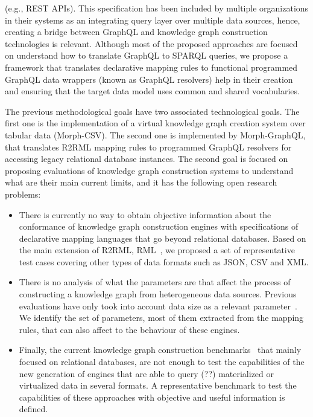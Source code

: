 \begin{itemize}
    (e.g., REST APIs). This specification has been included by multiple organizations in their systems as an integrating query layer over multiple data sources, hence, creating a bridge between GraphQL and knowledge graph construction technologies is relevant. Although most of the proposed approaches are focused on understand how to translate GraphQL to SPARQL queries, we propose a framework that translates declarative mapping rules to functional programmed GraphQL data wrappers (known as GraphQL resolvers) help in their creation and ensuring that the target data model uses common and shared vocabularies.
\end{itemize}

The previous methodological goals have two associated technological goals. The first one is the implementation of a virtual knowledge graph creation system over tabular data (Morph-CSV). The second one is implemented by Morph-GraphQL, that translates R2RML mapping rules to programmed GraphQL resolvers for accessing legacy relational database instances.
The second goal is focused on proposing evaluations of knowledge graph construction systems to understand what are their main current limits, and it has the following open research problems:
\begin{itemize}
    \item There is currently no way to obtain objective information about the conformance of knowledge graph construction engines with specifications of declarative mapping languages that go beyond relational databases. Based on the main extension of R2RML, RML~\citep{dimou2014rml}, we proposed a set of representative test cases covering other types of data formats such as JSON, CSV and XML.
    \item There is no analysis of what the parameters are that affect the process of constructing a knowledge graph from heterogeneous data sources. Previous evaluations have only took into account data size as a relevant parameter~\citep{lefranccois2017sparql,csimcsek2019rocketrml}. We identify the set of parameters, most of them extracted from the mapping rules, that can also affect to the behaviour of these engines.
    \item Finally, the current knowledge graph construction benchmarks~\citep{lanti2015npd,bizer2009berlin} that mainly focused on relational databases, are not enough to test the capabilities of the new generation of engines that are able to query (??) materialized or virtualized data in several formats. A representative benchmark to test the capabilities of these approaches with objective and useful information is defined.
\end{itemize}



